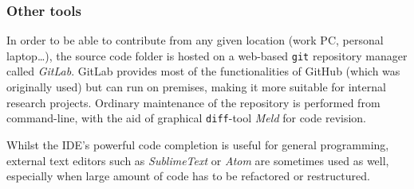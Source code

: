 

\subsubsection{Other tools}
In order to be able to contribute from any given location (work PC, personal laptop\dots), the source code folder is hosted on a web-based \texttt{git} repository manager called \emph{GitLab}.
GitLab provides most of the functionalities of GitHub (which was originally used) but can run on premises, making it more suitable for internal research projects.
Ordinary maintenance of the repository is performed from command-line, with the aid of graphical \texttt{diff}-tool \emph{Meld} for code revision.

Whilst the IDE's powerful code completion is useful for general programming, external text editors such as \emph{SublimeText} or \emph{Atom} are sometimes used as well, especially when large amount of code has to be refactored or restructured.
